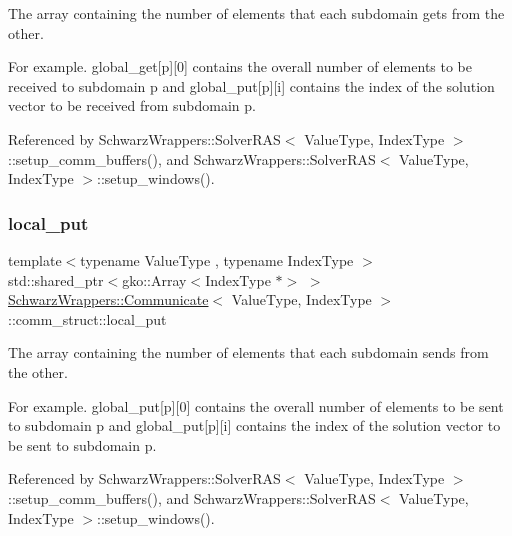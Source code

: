 The array containing the number of elements that each subdomain gets from the other. 

For example. global\+\_\+get\mbox{[}p\mbox{]}\mbox{[}0\mbox{]} contains the overall number of elements to be received to subdomain p and global\+\_\+put\mbox{[}p\mbox{]}\mbox{[}i\mbox{]} contains the index of the solution vector to be received from subdomain p. 

Referenced by Schwarz\+Wrappers\+::\+Solver\+R\+A\+S$<$ Value\+Type, Index\+Type $>$\+::setup\+\_\+comm\+\_\+buffers(), and Schwarz\+Wrappers\+::\+Solver\+R\+A\+S$<$ Value\+Type, Index\+Type $>$\+::setup\+\_\+windows().

\mbox{\label{structSchwarzWrappers_1_1Communicate_1_1comm__struct_aa42423af5a04fe17296cdf982a946615}} 
\subsubsection{\texorpdfstring{local\+\_\+put}{local\_put}}
{\footnotesize\ttfamily template$<$typename Value\+Type , typename Index\+Type $>$ \\
std\+::shared\+\_\+ptr$<$gko\+::\+Array$<$Index\+Type $\ast$$>$ $>$ \hyperlink{classSchwarzWrappers_1_1Communicate}{Schwarz\+Wrappers\+::\+Communicate}$<$ Value\+Type, Index\+Type $>$\+::comm\+\_\+struct\+::local\+\_\+put}



The array containing the number of elements that each subdomain sends from the other. 

For example. global\+\_\+put\mbox{[}p\mbox{]}\mbox{[}0\mbox{]} contains the overall number of elements to be sent to subdomain p and global\+\_\+put\mbox{[}p\mbox{]}\mbox{[}i\mbox{]} contains the index of the solution vector to be sent to subdomain p. 

Referenced by Schwarz\+Wrappers\+::\+Solver\+R\+A\+S$<$ Value\+Type, Index\+Type $>$\+::setup\+\_\+comm\+\_\+buffers(), and Schwarz\+Wrappers\+::\+Solver\+R\+A\+S$<$ Value\+Type, Index\+Type $>$\+::setup\+\_\+windows().

\mbox{\label{structSchwarzWrappers_1_1Communicate_1_1comm__struct_a64b5eabdeb27f804ff3c0fa81fb8e3a9}} 
